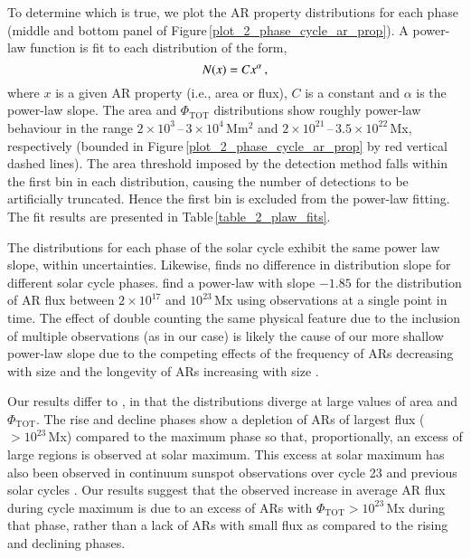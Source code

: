 \documentclass[namedreferences]{solarphysics}
\begin{document}
\begin{article}
To determine which is true, we plot the AR property distributions for each phase (middle and bottom panel of Figure\,\ref{plot_2_phase_cycle_ar_prop}). A power-law function is fit to each distribution %
 of the form,
\begin{equation}\label{eqn:powerlaw}
N(x) = C x^\alpha \mbox{\,,}
\end{equation}
where $x$ is a given AR property (i.e., area or flux), $C$ is a constant and $\alpha$ is the power-law slope. The area and $\Phi_{\mathrm{TOT}}$ distributions show roughly power-law behaviour in the range $2\times10^{3}$\,--\,$3\times10^4$\,Mm$^{2}$ and $2\times10^{21}$\,--\,$3.5\times10^{22}$\,Mx, respectively (bounded in Figure\,\ref{plot_2_phase_cycle_ar_prop} by red vertical dashed lines). The area threshold imposed by the detection method falls within the first bin in each distribution, causing the number of detections to be artificially truncated. Hence the first bin is excluded from the power-law fitting. The fit results are presented in Table\,\ref{table_2_plaw_fits}.

The distributions for each phase of the solar cycle exhibit the same power law slope, within uncertainties. Likewise, \citet{harvey:1993} finds no difference in distribution slope for different solar cycle phases. \citet{Parnell:2009} find a power-law with slope $-1.85$ for the distribution of AR flux between $2\times10^{17}$ and $10^{23}$\,Mx using observations at a single point in time. The effect of double counting the same physical feature due to the inclusion of multiple observations (as in our case) is likely the cause of our more shallow power-law slope \citep{tang:1984} due to the competing effects of the frequency of ARs decreasing with size and the longevity of ARs increasing with size \citep{Lefevre:2011}.

Our results differ to \citet{harvey:1993}, in that the distributions diverge at large values of area and $\Phi_{\mathrm{TOT}}$. The rise and decline phases show a depletion of ARs of largest flux ($>10^{23}$\,Mx) compared to the maximum phase so that, proportionally, an excess of large regions is observed at solar maximum. This excess at solar maximum has also been observed in continuum sunspot observations over cycle 23 and previous solar cycles \citep{Hathaway:2010b,Lefevre:2011,Kilcik:2011,deToma:2013}. Our results suggest that the observed increase in average AR flux during cycle maximum is due to an excess of ARs with $\Phi_{\mathrm{TOT}} >10^{23}$\,Mx during that phase, rather than a lack of ARs with small flux as compared to the rising and declining phases.


\end{article}
\end{document}

